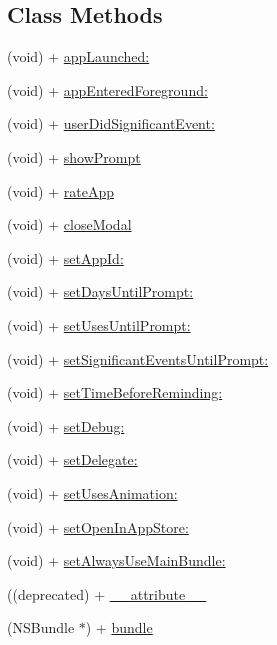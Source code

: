 \subsection*{Class Methods}
\begin{DoxyCompactItemize}
\item 
(void) + \hyperlink{interface_appirater_a1c4fbbfab2df2a7df980603928ebb4e7}{app\-Launched\-:}
\item 
(void) + \hyperlink{interface_appirater_adfb661a02ea0336dfd4ab5d3564e9a1d}{app\-Entered\-Foreground\-:}
\item 
(void) + \hyperlink{interface_appirater_a35e2cb8486a79c90b4bb3f99dfd27b3b}{user\-Did\-Significant\-Event\-:}
\item 
(void) + \hyperlink{interface_appirater_a81edf85af1e2379079e484af78af0b37}{show\-Prompt}
\item 
(void) + \hyperlink{interface_appirater_ab7744b312ed6e3bc0b466c35a3ffbc95}{rate\-App}
\item 
(void) + \hyperlink{interface_appirater_ababdaf499754acf6dab76bffcb963788}{close\-Modal}
\item 
(void) + \hyperlink{interface_appirater_afd088b35ecbacb5a668c934257080105}{set\-App\-Id\-:}
\item 
(void) + \hyperlink{interface_appirater_a7cb08941166d52b1ea2b3465e5a580e2}{set\-Days\-Until\-Prompt\-:}
\item 
(void) + \hyperlink{interface_appirater_a4722d2c18654f6f9dec3ba652eb48c2e}{set\-Uses\-Until\-Prompt\-:}
\item 
(void) + \hyperlink{interface_appirater_a6cc24cf2ee76d544906077a85a8905ff}{set\-Significant\-Events\-Until\-Prompt\-:}
\item 
(void) + \hyperlink{interface_appirater_af9c75e43b33915db4391ca7cd82c0822}{set\-Time\-Before\-Reminding\-:}
\item 
(void) + \hyperlink{interface_appirater_a7f1099968e8814cea5c4447629369f84}{set\-Debug\-:}
\item 
(void) + \hyperlink{interface_appirater_a2c80e4f19799e0f1ddfdae30a3ded4d5}{set\-Delegate\-:}
\item 
(void) + \hyperlink{interface_appirater_afe8c4f2aef73581e25f26667b1769ae1}{set\-Uses\-Animation\-:}
\item 
(void) + \hyperlink{interface_appirater_aac848666b0c8556d39f826f0baee78df}{set\-Open\-In\-App\-Store\-:}
\item 
(void) + \hyperlink{interface_appirater_a6678910ac1acec127583334fde49ac20}{set\-Always\-Use\-Main\-Bundle\-:}
\item 
((deprecated) + \hyperlink{interface_appirater_a70464a1185265199b8e54fb60c564420}{\-\_\-\-\_\-attribute\-\_\-\-\_\-}
\item 
(N\-S\-Bundle $\ast$) + \hyperlink{interface_appirater_a7f20ffc623766d8dca88c982f50b5e97}{bundle}
\end{DoxyCompactItemize}
